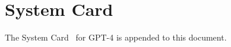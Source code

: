 \documentclass{article}
\begin{document}
\section{System Card}

The System Card~\cite{mitchellModelCardsModel2019, greenSystemCardsNew2022} for GPT-4 is appended to this document.

 \clearpage
{}\label{systemcard}
 
\end{document}
